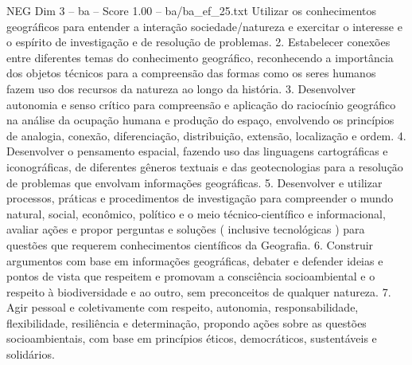 \begin{textsample}{NEG Dim 3 – ba – Score 1.00 – ba/ba\_ef\_25.txt}
Utilizar os conhecimentos geográficos para entender a interação sociedade/natureza e exercitar o interesse e o espírito de investigação e de resolução de problemas. 2.
Estabelecer conexões entre diferentes temas do conhecimento geográfico, reconhecendo a importância dos objetos técnicos para a compreensão das formas como os seres humanos fazem uso dos recursos da natureza ao longo da história. 3.
Desenvolver autonomia e senso crítico para compreensão e aplicação do raciocínio geográfico na análise da ocupação humana e produção do espaço, envolvendo os princípios de analogia, conexão, diferenciação, distribuição, extensão, localização e ordem. 4.
Desenvolver o pensamento espacial, fazendo uso das linguagens cartográficas e iconográficas, de diferentes gêneros textuais e das geotecnologias para a resolução de problemas que envolvam informações geográficas. 5.
Desenvolver e utilizar processos, práticas e procedimentos de investigação para compreender o mundo natural, social, econômico, político e o meio técnico-científico e informacional, avaliar ações e propor perguntas e soluções ( inclusive tecnológicas ) para questões que requerem conhecimentos científicos da Geografia. 6.
Construir argumentos com base em informações geográficas, debater e defender ideias e pontos de vista que respeitem e promovam a consciência socioambiental e o respeito à biodiversidade e ao outro, sem preconceitos de qualquer natureza. 7.
Agir pessoal e coletivamente com respeito, autonomia, responsabilidade, flexibilidade, resiliência e determinação, propondo ações sobre as questões socioambientais, com base em princípios éticos, democráticos, sustentáveis e solidários.

\end{textsample}

